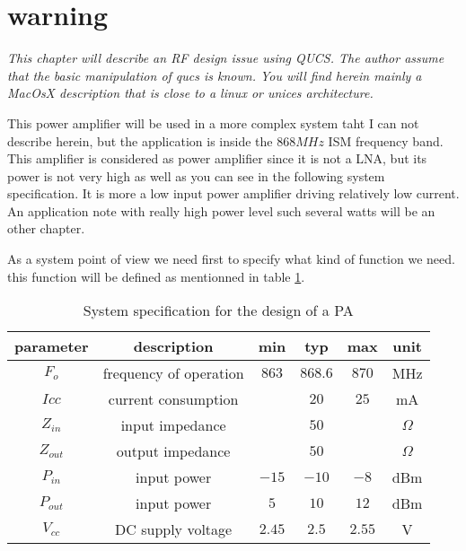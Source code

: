 %
%
%
%

\section*{warning}

\textit{
This chapter will describe an RF design issue using QUCS. The author assume that the basic manipulation of qucs is known. You will find herein mainly a MacOsX description that is close to a linux or unices architecture.
}


This power amplifier will be used in a more complex system taht I can not describe herein, but the application is inside the $868MHz$ ISM frequency band. This amplifier is considered as power amplifier since it is not a LNA, but its power is not very high as well as you can see in the following system specification. It is more a low input power amplifier driving relatively low current. An application note with really high power level such several watts will be an other chapter.



As a system point of view we need first to specify what kind of function we need. this function will be defined as mentionned in table \ref{design:pa:systemSpecification}.


\begin{table}[htp]
\caption{System specification for the design of a PA}
\begin{center}
\begin{tabular}{|c|c|c|c|c|c|} \hline
parameter & description 					& min   & typ     & max   & unit \\ \hline \hline
$F_o$     & frequency of operation		& $863$ & $868.6$ & $870$ & MHz \\
$Icc$ 	   & current consumption        &       & $20$    & $25$    & mA \\ \hline
$Z_{in}$  & input impedance            &       & $50$    &        & $\Omega$ \\
$Z_{out}$  & output impedance            &       & $50$    &        & $\Omega$ \\ \hline
$P_{in}$   & input power                &   $-15$ & $-10$ & $-8$ & dBm \\
$P_{out}$   & input power                &   $5$ & $10$ & $12$ & dBm \\ \hline
$V_{cc}$   & DC supply voltage                &   $2.45$ & $2.5$ & $2.55$ & V \\ \hline
\end{tabular}
\end{center}
\label{design:pa:systemSpecification}
\end{table}

